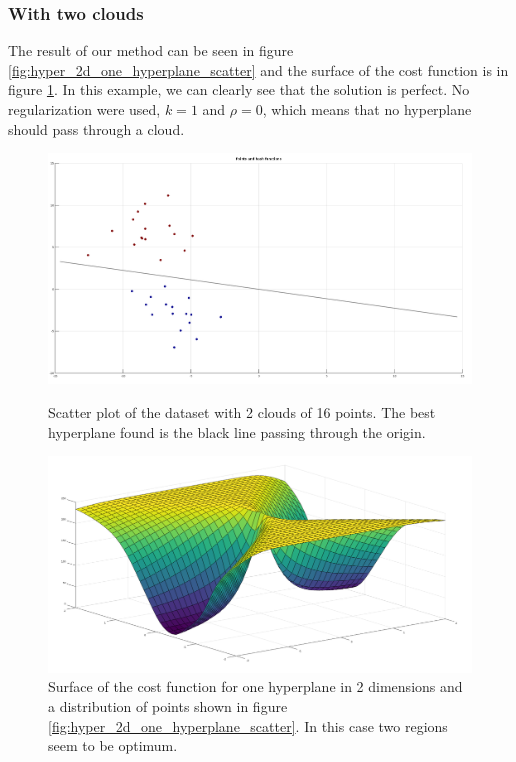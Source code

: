 \subsubsection{With two clouds}
The result of our method can be seen in figure \ref{fig:hyper_2d_one_hyperplane_scatter} and the surface of the cost function is in figure \ref{fig:hyper_2d_one_hyperplane_cost}. In this example, we can clearly see that the solution is perfect. No regularization were used, $k=1$ and $\rho=0$, which means that no hyperplane should pass through a cloud.

\begin{figure}
	\centering
	
	\includegraphics[width=\textwidth]{img/hyper_2d_one_hyperplane_scatter.png}
	\caption{Scatter plot of the dataset with 2 clouds of 16 points. The best hyperplane found is the black line passing through the origin.}
	\label{fig:hyper_2d_one_hyperplane_scatter}
	
	\includegraphics[width=\textwidth]{img/hyper_2d_one_hyperplane_cost.png}
	\caption{Surface of the cost function for one hyperplane in 2 dimensions and a distribution of points shown in figure \ref{fig:hyper_2d_one_hyperplane_scatter}. In this case two regions seem to be optimum.}
	\label{fig:hyper_2d_one_hyperplane_cost}
\end{figure}

